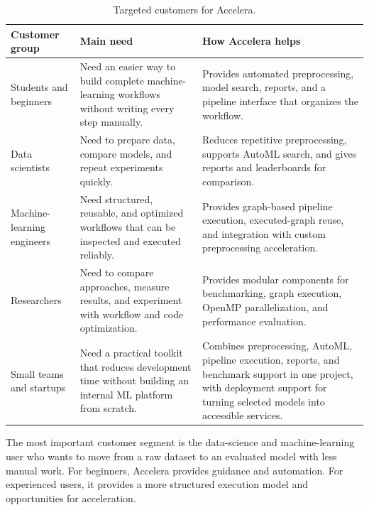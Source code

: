 \documentclass[12pt,a4paper]{report}
\newcommand{\acceleraTableStyle}{%
\small
\renewcommand{\arraystretch}{1.15}
\setlength{\tabcolsep}{4pt}%
}
\begin{document}
\begin{table}[!htbp]
\centering
\acceleraTableStyle
\caption{Targeted customers for Accelera.}
\label{tab:target-customers}
\begin{tabular}{p{}p{}p{}}
\toprule
\textbf{Customer group} & \textbf{Main need} & \textbf{How Accelera helps} \\
\midrule

Students and beginners &
Need an easier way to build complete machine-learning workflows without writing
every step manually. &
Provides automated preprocessing, model search, reports, and a pipeline
interface that organizes the workflow. \\
\midrule

Data scientists &
Need to prepare data, compare models, and repeat experiments quickly. &
Reduces repetitive preprocessing, supports AutoML search, and gives reports and
leaderboards for comparison. \\
\midrule

Machine-learning engineers &
Need structured, reusable, and optimized workflows that can be inspected and
executed reliably. &
Provides graph-based pipeline execution, executed-graph reuse, and integration
with custom preprocessing acceleration. \\
\midrule

Researchers &
Need to compare approaches, measure results, and experiment with workflow and
code optimization. &
Provides modular components for benchmarking, graph execution, OpenMP
parallelization, and performance evaluation. \\
\midrule

Small teams and startups &
Need a practical toolkit that reduces development time without building an
internal ML platform from scratch. &
Combines preprocessing, AutoML, pipeline execution, reports, and benchmark
support in one project, with deployment support for turning selected models
into accessible services. \\

\bottomrule
\end{tabular}
\end{table}

\medskip
\noindent The most important customer segment is the data-science and machine-learning
user who wants to move from a raw dataset to an evaluated model with less manual
work. For beginners, Accelera provides guidance and automation. For experienced
users, it provides a more structured execution model and opportunities for
acceleration.
\end{document}
